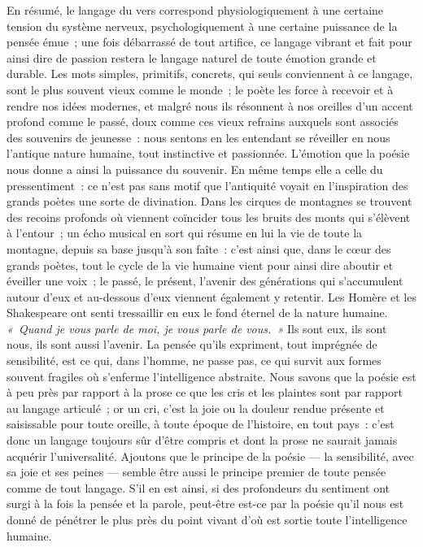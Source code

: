 \documentclass[french,twoside]{book} %
\begin{document}
En résumé, le langage du vers correspond physiologiquement à une certaine tension du système nerveux, psychologiquement à une certaine puissance de la pensée émue ; une fois débarrassé de tout artifice, ce langage vibrant et fait pour ainsi dire de passion restera le langage naturel de toute émotion grande et durable. Les mots simples, primitifs, concrets, qui seuls conviennent à ce langage, sont le plus souvent vieux comme le monde ; le poète les force à recevoir et à rendre nos idées modernes, et malgré nous ils résonnent à nos oreilles d’un accent profond comme le passé, doux comme ces vieux refrains auxquels sont associés des souvenirs de jeunesse : nous sentons en les entendant se réveiller en nous l’antique nature humaine, tout instinctive et passionnée. L’émotion que la poésie nous donne a ainsi la puissance du souvenir.  En même temps elle a celle du pressentiment : ce n’est pas sans motif que l’antiquité voyait en l’inspiration des grands poètes une sorte de divination. Dans les cirques de montagnes se trouvent des recoins profonds où viennent coïncider tous les bruits des monts qui s’élèvent à l’entour ; un écho musical en sort qui résume en lui la vie de toute la montagne, depuis sa base jusqu’à son faîte : c’est ainsi que, dans le cœur des grands poètes, tout le cycle de la vie humaine vient pour ainsi dire aboutir et éveiller une voix ; le passé, le présent, l’avenir des générations qui s’accumulent autour d’eux et au-dessous d’eux viennent également y retentir. Les Homère et les Shakespeare ont senti tressaillir en eux le fond éternel de la nature humaine. \emph{« Quand je vous parle de moi, je vous parle de vous. »} Ils sont eux, ils sont nous, ils sont aussi l’avenir. La pensée qu’ils expriment, tout imprégnée de sensibilité, est ce qui, dans l’homme, ne passe pas, ce qui survit aux formes souvent fragiles où s’enferme l’intelligence abstraite. Nous savons que la poésie est à peu près par rapport à la prose ce que les cris et les plaintes sont par rapport au langage articulé ; or un cri, c’est la joie ou la douleur rendue présente et saisissable pour toute oreille, à toute époque de l’histoire, en tout pays : c’est donc un langage toujours sûr d’être compris et dont la prose ne saurait jamais acquérir l’universalité. Ajoutons que le principe de la poésie — la sensibilité, avec sa joie et ses peines — semble être aussi le principe premier de toute pensée comme de tout langage. S’il en est ainsi, si des  profondeurs du sentiment ont surgi à la fois la pensée et la parole, peut-être est-ce par la poésie qu’il nous est donné de pénétrer le plus près du point vivant d’où est sortie toute l’intelligence humaine.
 
\end{document}
